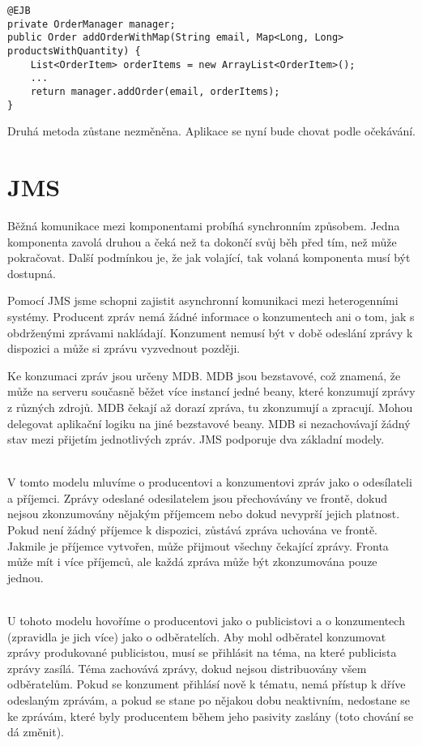 \documentclass[122pt,oneside]{fithesis}
\begin{document}
\begin{lstlisting}
@EJB
private OrderManager manager;
public Order addOrderWithMap(String email, Map<Long, Long> productsWithQuantity) {
	List<OrderItem> orderItems = new ArrayList<OrderItem>();
	...
	return manager.addOrder(email, orderItems);
}
\end{lstlisting}

Druhá metoda zůstane nezměněna. Aplikace se nyní bude chovat podle očekávání.


\section{JMS}
Běžná komunikace mezi komponentami probíhá synchronním způsobem. Jedna komponenta zavolá druhou a čeká než ta dokončí svůj běh před tím, než může pokračovat. Další podmínkou je, že jak volající, tak volaná komponenta musí být dostupná.

Pomocí JMS jsme schopni zajistit asynchronní komunikaci mezi heterogenními systémy. Producent zpráv nemá žádné informace o konzumentech ani o tom, jak s obdrženými zprávami nakládají. Konzument nemusí být v době odeslání zprávy k dispozici a může si zprávu vyzvednout později.

Ke konzumaci zpráv jsou určeny MDB. MDB jsou bezstavové, což znamená, že může na serveru současně běžet více instancí jedné beany, které konzumují zprávy z různých zdrojů. MDB čekají až dorazí zpráva, tu zkonzumují a zpracují. Mohou delegovat aplikační logiku na jiné bezstavové beany. MDB si nezachovávají žádný stav mezi přijetím jednotlivých zpráv.
JMS podporuje dva základní modely.

\vspace{5 mm}
\\\indent V tomto modelu mluvíme o producentovi a konzumentovi zpráv jako o odesílateli a příjemci. Zprávy odeslané odesilatelem jsou přechovávány ve frontě, dokud nejsou zkonzumovány nějakým příjemcem nebo dokud nevyprší jejich platnost. Pokud není žádný příjemce k dispozici, zůstává zpráva uchována ve frontě. Jakmile je příjemce vytvořen, může přijmout všechny čekající zprávy. Fronta může mít i více příjemců, ale každá zpráva může být zkonzumována pouze jednou.

\vspace{5 mm}
\\\indent U tohoto modelu hovoříme o producentovi jako o publicistovi a o konzumentech (zpravidla je jich více) jako o odběratelích. Aby mohl odběratel konzumovat zprávy produkované publicistou, musí se přihlásit na téma, na které publicista zprávy zasílá. Téma zachovává zprávy, dokud nejsou distribuovány všem odběratelům. Pokud se konzument přihlásí nově k tématu, nemá přístup k dříve odeslaným zprávám, a pokud se stane po nějakou dobu neaktivním, nedostane se ke zprávám, které byly producentem během jeho pasivity zaslány (toto chování se dá změnit).
\end{document}
